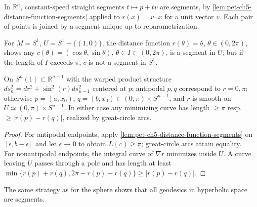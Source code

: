 \begin{example}
  \label{ex:pet-ch5-euclidean-segments}
  In $\mathbb R^n$, constant-speed straight segments $t\mapsto p+tv$ are segments, by
  \cref{lem:pet-ch5-distance-function-segments} applied to $r(x)=v\cdot x$ for a unit
  vector $v$. Each pair of points is joined by a segment unique up to
  reparametrization.
\end{example}

\begin{example}
  \label{ex:pet-ch5-circle-segment}
  For $M=S^1$, $U=S^1-\{(1,0)\}$, the distance function $r(\theta)=\theta$,
  $\theta\in(0,2\pi)$, shows any $c(\theta)=(\cos\theta,\sin\theta)$, $\theta\in
  I\subset(0,2\pi)$, is a segment in $U$; but if the length of $I$ exceeds $\pi$,
  $c$ is not a segment in $S^1$.
\end{example}

\begin{example}
  \label{ex:pet-ch5-sphere-segments}
  On $S^n(1)\subset\mathbb R^{n+1}$ with the warped product structure
  $ds_n^2=dr^2+\sin^2(r)ds_{n-1}^2$ centered at $p$: antipodal $p,q$ correspond to
  $r=0,\pi$; otherwise $p=(a,x_0)$, $q=(b,x_0)\in(0,\pi)\times S^{n-1}$, and $r$ is
  smooth on $U\simeq(0,\pi)\times S^{n-1}$. In either case any minimizing curve has
  length $\ge\pi$ resp.\ $\ge|r(p)-r(q)|$, realized by great-circle arcs.
\end{example}
\begin{proof}
  \sketch
  For antipodal endpoints, apply \cref{lem:pet-ch5-distance-function-segments} on
  $[\epsilon,b-\epsilon]$ and let $\epsilon\to0$ to obtain $L(c)\ge\pi$;
  great-circle arcs attain equality.  For nonantipodal endpoints, the integral
  curve of $\nabla r$ minimizes inside $U$.  A curve leaving $U$ passes through a
  pole and has length at least
  $\min\{r(p)+r(q),2\pi-r(p)-r(q)\}\ge|r(p)-r(q)|$.
\end{proof}

\begin{example}
  \label{ex:pet-ch5-hyperbolic-segments}
  The same strategy as for the sphere shows that all geodesics in hyperbolic space
  are segments.
\end{example}

